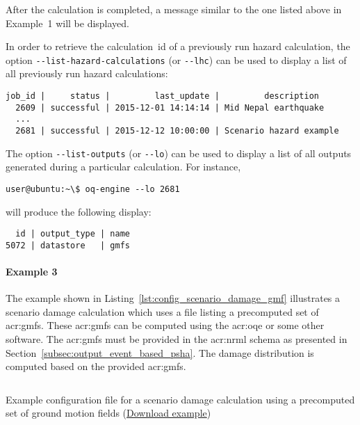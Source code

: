 After the calculation is completed, a message similar to the one listed above
in Example~1 will be displayed.

In order to retrieve the calculation~id of a previously run hazard calculation,
the option \Verb+--list-hazard-calculations+ (or \Verb+--lhc+) can be used to
display a list of all previously run hazard calculations:

\begin{verbatim}
job_id |     status |         last_update |         description
  2609 | successful | 2015-12-01 14:14:14 | Mid Nepal earthquake
  ...
  2681 | successful | 2015-12-12 10:00:00 | Scenario hazard example
\end{verbatim}

The option \Verb+--list-outputs+ (or \Verb+--lo+) can be used to display a
list of all outputs generated during a particular calculation. For instance,

\begin{verbatim}
user@ubuntu:~\$ oq-engine --lo 2681
\end{verbatim}

will produce the following display:

\begin{verbatim}
  id | output_type | name
5072 | datastore   | gmfs
\end{verbatim}


\paragraph{Example 3}

The example shown in Listing~\ref{lst:config_scenario_damage_gmf} illustrates
a scenario damage calculation which uses a file listing a precomputed set of
\glspl{acr:gmf}. These \glspl{acr:gmf} can be computed using the
\glsdesc{acr:oqe} or some other software. The \glspl{acr:gmf} must be provided
in the \gls{acr:nrml} schema as presented in
Section~\ref{subsec:output_event_based_psha}. The damage distribution is
computed based on the provided \glspl{acr:gmf}.

\begin{listing}[htbp]
  \inputminted[firstline=1,firstnumber=1,fontsize=\footnotesize,frame=single,linenos,bgcolor=lightgray,label=job.ini]{ini}{oqum/risk/verbatim/config_scenario_damage_gmf.ini}
  \caption{Example configuration file for a scenario damage calculation using a precomputed set of ground motion fields (\href{https://raw.githubusercontent.com/GEMScienceTools/oq-engine-docs/master/oqum/risk/verbatim/config_scenario_damage_gmf.xml}{Download example})}
  \label{lst:config_scenario_damage_gmf}
\end{listing}

